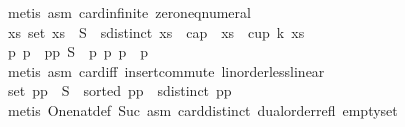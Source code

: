 \begin{isabellebody}
\ {\isacharparenleft}{\kern0pt}metis\ asm{\isacharparenleft}{\kern0pt}{}{\isacharparenright}{\kern0pt}\ card{\isachardot}{\kern0pt}infinite\ zero{\isacharunderscore}{\kern0pt}neq{\isacharunderscore}{\kern0pt}numeral{\isacharparenright}{\kern0pt}\isanewline
\ \ \ \ \ \ \isamarkupfalse%
\ {\isachardoublequoteopen}{\isacharparenleft}{\kern0pt}{\isasymexists}xs{\isachardot}{\kern0pt}\ set\ xs\ {\isasymsubseteq}\ S\ {\isasymand}\ sdistinct\ xs\ {\isasymand}\ {\isacharparenleft}{\kern0pt}cap\ {}\ xs\ {\isasymor}\ cup\ k\ xs{\isacharparenright}{\kern0pt}{\isacharparenright}{\kern0pt}{\isachardoublequoteclose}\isanewline
\ \ \ \ \ \ \isamarkupfalse%
{\isacharminus}{\kern0pt}\isanewline
\ \ \ \ \ \ \ \ \isamarkupfalse%
\ p{}\ p{}\ \ p{}p{}{\isacharcolon}{\kern0pt}\ {\isachardoublequoteopen}S\ {\isacharequal}{\kern0pt}\ {\isacharbraceleft}{\kern0pt}p{}{\isacharcomma}{\kern0pt}\ p{}{\isacharbraceright}{\kern0pt}{\isachardoublequoteclose}\ {\isachardoublequoteopen}p{}\ {\isacharless}{\kern0pt}\ p{}{\isachardoublequoteclose}\isanewline
\ \ \ \ \ \ \ \ \ \ \isamarkupfalse%
\ {\isacharparenleft}{\kern0pt}metis\ asm{\isacharparenleft}{\kern0pt}{}{\isacharparenright}{\kern0pt}\ card{\isacharunderscore}{\kern0pt}{}{\isacharunderscore}{\kern0pt}iff\ insert{\isacharunderscore}{\kern0pt}commute\ linorder{\isacharunderscore}{\kern0pt}less{\isacharunderscore}{\kern0pt}linear{\isacharparenright}{\kern0pt}\isanewline
\ \ \ \ \ \ \ \ \isamarkupfalse%
\ {}{\isacharcolon}{\kern0pt}{\isachardoublequoteopen}set\ {\isacharbrackleft}{\kern0pt}p{}{\isacharcomma}{\kern0pt}p{}{\isacharbrackright}{\kern0pt}\ {\isasymsubseteq}\ S\ {\isasymand}\ sorted\ {\isacharbrackleft}{\kern0pt}p{}{\isacharcomma}{\kern0pt}p{}{\isacharbrackright}{\kern0pt}\ {\isasymand}\ sdistinct\ {\isacharbrackleft}{\kern0pt}p{}{\isacharcomma}{\kern0pt}p{}{\isacharbrackright}{\kern0pt}{\isachardoublequoteclose}\isanewline
\ \ \ \ \ \ \ \ \ \ \isamarkupfalse%
\ {\isacharparenleft}{\kern0pt}metis\ One{\isacharunderscore}{\kern0pt}nat{\isacharunderscore}{\kern0pt}def\ Suc{\isacharunderscore}{\kern0pt}{}\ asm{\isacharparenleft}{\kern0pt}{}{\isacharcomma}{\kern0pt}{}{\isacharparenright}{\kern0pt}\ card{\isacharunderscore}{\kern0pt}distinct\ dual{\isacharunderscore}{\kern0pt}order{\isachardot}{\kern0pt}refl\ empty{\isacharunderscore}{\kern0pt}set\isanewline

\end{isabellebody}
